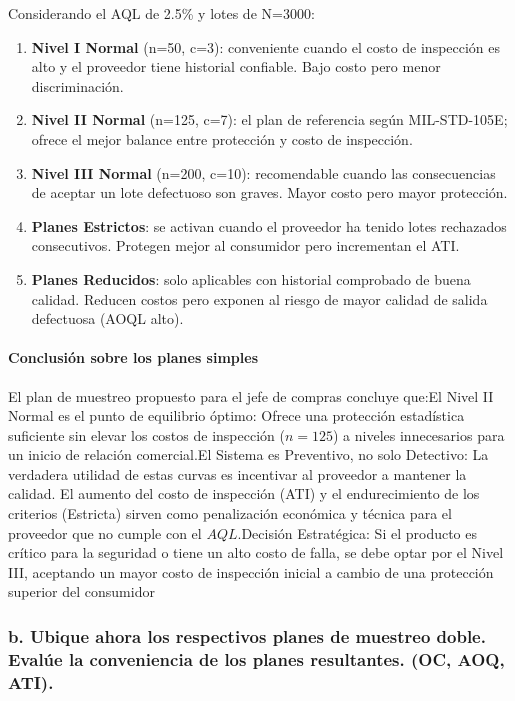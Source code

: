 \documentclass[
  12pt,
]{article}
\begin{document}
Considerando el AQL de 2.5\% y lotes de N=3000:

\begin{enumerate}
\def\labelenumi{\arabic{enumi}.}
\item
  \textbf{Nivel I Normal} (n=50, c=3): conveniente cuando el costo de
  inspección es alto y el proveedor tiene historial confiable. Bajo
  costo pero menor discriminación.
\item
  \textbf{Nivel II Normal} (n=125, c=7): el plan de referencia según
  MIL-STD-105E; ofrece el mejor balance entre protección y costo de
  inspección.
\item
  \textbf{Nivel III Normal} (n=200, c=10): recomendable cuando las
  consecuencias de aceptar un lote defectuoso son graves. Mayor costo
  pero mayor protección.
\item
  \textbf{Planes Estrictos}: se activan cuando el proveedor ha tenido
  lotes rechazados consecutivos. Protegen mejor al consumidor pero
  incrementan el ATI.
\item
  \textbf{Planes Reducidos}: solo aplicables con historial comprobado de
  buena calidad. Reducen costos pero exponen al riesgo de mayor calidad
  de salida defectuosa (AOQL alto).
\end{enumerate}

\paragraph{Conclusión sobre los planes
simples}\label{conclusiuxf3n-sobre-los-planes-simples}

El plan de muestreo propuesto para el jefe de compras concluye que:El
Nivel II Normal es el punto de equilibrio óptimo: Ofrece una protección
estadística suficiente sin elevar los costos de inspección (\(n=125\)) a
niveles innecesarios para un inicio de relación comercial.El Sistema es
Preventivo, no solo Detectivo: La verdadera utilidad de estas curvas es
incentivar al proveedor a mantener la calidad. El aumento del costo de
inspección (ATI) y el endurecimiento de los criterios (Estricta) sirven
como penalización económica y técnica para el proveedor que no cumple
con el \(AQL\).Decisión Estratégica: Si el producto es crítico para la
seguridad o tiene un alto costo de falla, se debe optar por el Nivel
III, aceptando un mayor costo de inspección inicial a cambio de una
protección superior del consumidor

\subsubsection{b. Ubique ahora los respectivos planes de muestreo doble.
Evalúe la conveniencia de los planes resultantes. (OC, AOQ,
ATI).}\label{b.-ubique-ahora-los-respectivos-planes-de-muestreo-doble.-evaluxfae-la-conveniencia-de-los-planes-resultantes.-oc-aoq-ati.}
\end{document}
